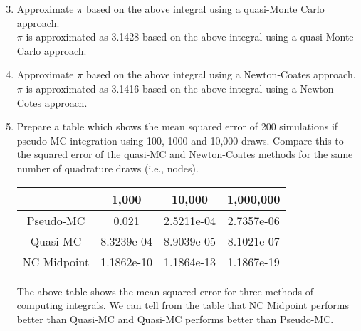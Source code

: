 \documentclass{article}
\begin{document}
\begin{enumerate}
\setcounter{enumi}{2}
\item Approximate $\pi$ based on the above integral using a quasi-Monte Carlo approach. \\[1em]

$\pi$ is approximated as 3.1428 based on the above integral using a quasi-Monte Carlo approach. \\[1em]

\item Approximate $\pi$ based on the above integral using a Newton-Coates approach. \\[1em]

$\pi$ is approximated as 3.1416 based on the above integral using a Newton Cotes approach. \\[1em]

\item Prepare a table which shows the mean squared error of 200 simulations if pseudo-MC integration using 100, 1000 and 10,000 draws. Compare this to the squared error of the quasi-MC and Newton-Coates methods for the same number of quadrature draws (i.e., nodes). \\[1em]
\begin{center}
 \begin{tabular}{|c | c|  c| c|} 
 \hline
 & 1,000  & 10,000  & 1,000,000 \\ 
\hline
Pseudo-MC & 0.021 & 2.5211e-04 & 2.7357e-06  \\
\hline
Quasi-MC & 8.3239e-04 & 8.9039e-05 & 8.1021e-07 \\
\hline
NC Midpoint & 1.1862e-10 & 1.1864e-13  & 1.1867e-19  \\
\hline
 
\end{tabular}
\end{center}
The above table shows the mean squared error for three methods of computing integrals. We can tell from the table that NC Midpoint performs better than Quasi-MC and Quasi-MC performs better than Pseudo-MC. 





\end{enumerate}
\end{document}
